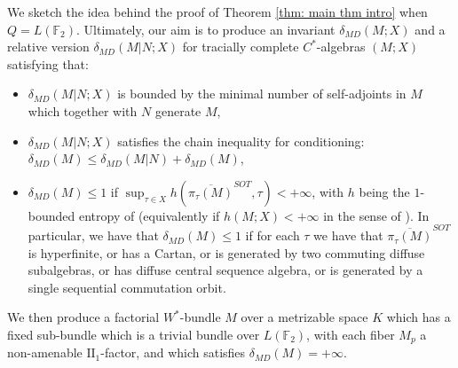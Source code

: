 \documentclass[10pt]{amsart}
\theoremstyle{definition}
\numberwithin{equation}{section}
\newcommand{\bF}{{\mathbb F}}
\begin{document}
We sketch the idea behind the proof of Theorem \ref{thm: main thm intro} when $Q=L(\bF_{2})$.
Ultimately, our aim is to produce an invariant $\delta_{MD}(M;X)$ and a relative version $\delta_{MD}(M|N;X)$ for tracially complete $C^{*}$-algebras $(M;X)$ satisfying that: 
\begin{itemize}
    \item $\delta_{MD}(M|N;X)$ is bounded by the minimal number of self-adjoints in $M$ which together with $N$ generate $M$,
    \item $\delta_{MD}(M|N;X)$ satisfies the chain inequality for conditioning: $\delta_{MD}(M)\leq \delta_{MD}(M|N)+\delta_{MD}(M)$,
    \item $\delta_{MD}(M)\leq 1$ if $\sup_{\tau\in X}h(\overline{\pi_{\tau}(M)}^{SOT},\tau)<+\infty$, with $h$ being the $1$-bounded entropy of \cite{Jung2007, Hayes2018} (equivalently if $h(M;X)<+\infty$ in the sense of \cite{macmahon20261boundedentropycalgebras}). In particular, we have that $\delta_{MD}(M)\leq 1$ if for each $\tau$ we have that $\overline{\pi_{\tau}(M)}^{SOT}$ is hyperfinite, or has a Cartan, or is generated by two commuting diffuse subalgebras, or has diffuse central sequence algebra, or is generated by a single sequential commutation orbit. 
\end{itemize}
We then produce a factorial $W^{*}$-bundle $M$ over a metrizable space $K$ which has a fixed sub-bundle which is a trivial bundle over $L(\bF_{2})$, with each fiber $M_{p}$ a non-amenable $\textrm{II}_{1}$-factor, and which satisfies $\delta_{MD}(M)=+\infty$. 
\end{document}
